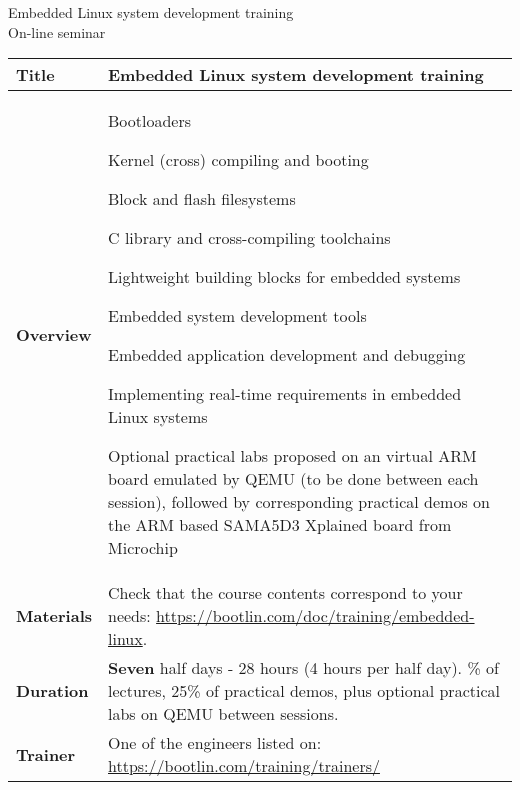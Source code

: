 \documentclass[a4paper,12pt,obeyspaces,spaces,hyphens]{article}
\begin{document}
\setlength{\arrayrulewidth}{0.8pt}

\begin{center}
\LARGE
Embedded Linux system development training\\
\large
On-line seminar
\end{center}
\vspace{1cm}

\small
{}

 {
  \begin{tabularx}{\textwidth}{|g|h|}
    {\bf Title} & {\bf Embedded Linux system development training} \\
    \hline

    {\bf Overview} &
    Bootloaders \par
    Kernel (cross) compiling and booting \par
    Block and flash filesystems \par
    C library and cross-compiling toolchains \par
    Lightweight building blocks for embedded systems \par
    Embedded system development tools \par
    Embedded application development and debugging \par
    Implementing real-time requirements in embedded Linux systems \par
    Optional practical labs proposed on an virtual ARM board
    emulated by QEMU (to be done between each session),
    followed by corresponding practical demos on the ARM based SAMA5D3
    Xplained board from Microchip \\
    \hline
    {\bf Materials} &
    Check that the course contents correspond to your needs:
    \newline \url{https://bootlin.com/doc/training/embedded-linux}. \\
    \hline

    {\bf Duration} & {\bf Seven } half days - 28 hours (4 hours per half day).
    \% of lectures, 25\% of practical demos, plus optional
    practical labs on QEMU between sessions. \\
    \hline

    {\bf Trainer} & One of the engineers listed on:
    \newline \url{https://bootlin.com/training/trainers/}\\
    \hline


\end{tabularx}}
\end{document}
